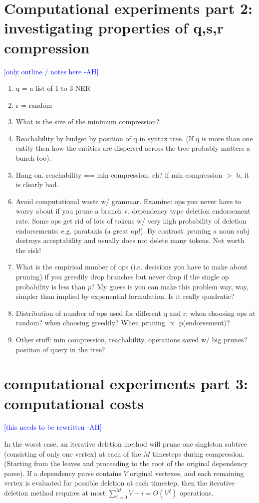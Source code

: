\documentclass[11pt,a4paper]{article}
\newcommand{\ahcomment}[1]{\textcolor{blue}{[#1 -AH]}}
\begin{document}
\section{Computational experiments part 2: investigating properties of q,s,r compression}

\ahcomment{only outline / notes here}

\begin{enumerate}
\item{q = a list of 1 to 3 NER}
\item{r = random}
\item{What is the size of the minimum compression?}
\item{Reachability by budget by position of q in syntax tree. (If q is more than one entity then how the entities are dispersed across the tree probably matters a bunch too).}
\item{Hang on. reachability == min compression, eh? if min compression $>$ b, it is clearly bad.}
\item{Avoid computational waste w/ grammar.  Examine: ops you never have to worry about if you prune a branch v. dependency type deletion endorsement rate. Some ops get rid of lots of tokens w/ very high probability of deletion endorsements: e.g. parataxis (a great op!). By contrast: pruning a noun subj destroys acceptability and usually does not delete many tokens. Not worth the risk!}
\item{What is the empirical number of ops (i.e. decisions you have to make about pruning) if you greedily drop branches but never drop if the single op probability is less than $p$? My guess is you can make this problem way, way, simpler than implied by exponential formulation. Is it really quadratic?}
\item{Distribution of number of ops used for different q and r: when choosing ops at random? when choosing greedily? When pruning $\propto$ p(endorsement)?}
\item{Other stuff: min compression, reachability, operations saved w/ big prunes? position of query in the tree?}
\end{enumerate}

\section{computational experiments part 3: computational costs}

\ahcomment{this needs to be rewritten}

In the worst case, an iterative deletion method will prune one singleton subtree (consisting of only one vertex) at each of the $M$ timesteps during compression. (Starting from the leaves and proceeding to the root of the original dependency parse). If a dependency parse contains $V$ original vertexes, and each remaining vertex is evaluated for possible deletion at each timestep, then the iterative deletion method requires at most ${\sum_{i = 0}^M V - i = O(V^2)}$ operations.
\end{document}

